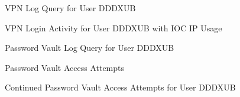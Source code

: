 \documentclass[11pt]{article}
\begin{document}
	\begin{figure}[h]
		\centering
		\caption{VPN Log Query for User DDDXUB}
		\label{fig: A19}
	\end{figure}
	
	\begin{figure}[h]
		\centering
		\caption{VPN Login Activity for User DDDXUB with IOC IP Usage}
		\label{fig: A20}
	\end{figure}
	
	\begin{figure}[h]
		\centering
		\caption{Password Vault Log Query for User DDDXUB}
		\label{fig: A21}
	\end{figure}
	
	\begin{figure}[h]
		\centering
		\caption{Password Vault Access Attempts}
		\label{fig: A22}
	\end{figure}
	
	\begin{figure}[h]
		\centering
		\caption{Continued Password Vault Access Attempts for User DDDXUB}
		\label{fig: A23}
	\end{figure}
	
\end{document}
